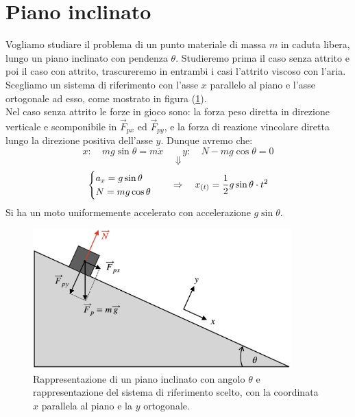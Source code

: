 \section{Piano inclinato}
Vogliamo studiare il problema di un punto materiale di massa $m$ in caduta
libera, lungo un piano inclinato con pendenza $\theta$. Studieremo prima il
caso senza attrito e poi il caso con attrito, trascureremo in entrambi i
casi l'attrito viscoso con l'aria. \\
Scegliamo un sistema di riferimento con l'asse $x$ parallelo al piano e
l'asse ortogonale ad esso, come mostrato in figura (\ref{fig:Iplain&pendulum:Iplain}).
\\ Nel caso senza attrito le forze in gioco sono: la forza peso diretta in
direzione verticale e scomponibile in $\vec F_{px}$ ed $\vec F_{py}$, e la
forza di reazione vincolare diretta lungo la direzione positiva dell'asse $y$.
Dunque avremo che:
\begin{equation}
    x:\quad mg\sin\theta = m\ddot x\quad\quad y: \quad N - mg\cos\theta = 0
\end{equation}
$$\Downarrow$$
\begin{equation}
    \begin{cases}
        a_x = g\sin\theta\\
        N = mg\cos\theta
    \end{cases}
    \quad\Rightarrow\quad x_{(t)} = \frac12 g\sin\theta\cdot t^2
\end{equation}
Si ha un moto uniformemente accelerato con accelerazione $g\sin\theta$.
\begin{figure}[htbp]
 \center
        \includegraphics[width=10cm]{images/pianoincl.png}
        \caption{Rappresentazione di un piano inclinato con angolo $\theta$ e
        rappresentazione del sistema di riferimento scelto, con la coordinata $x$
        parallela al piano e la $y$ ortogonale.}
\label{fig:Iplain&pendulum:Iplain}
\end{figure}
